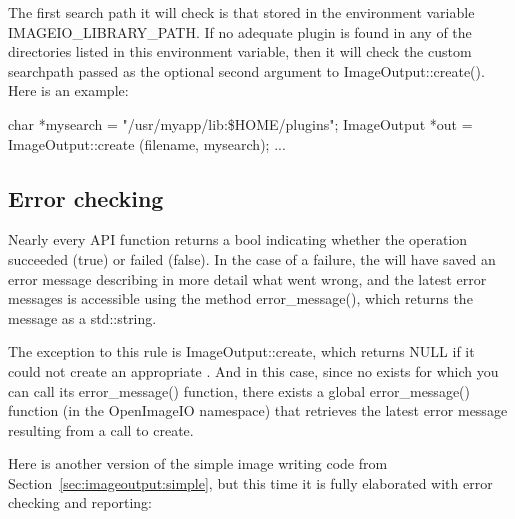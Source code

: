 The first search path it will check is that stored in the environment
variable {\cf IMAGEIO_LIBRARY_PATH}.  If no adequate plugin is found
in any of the directories listed in this environment variable, then
it will check the custom searchpath passed as the optional second
argument to {\cf ImageOutput::create()}.  Here is an example:

\begin{code}
        char *mysearch = "/usr/myapp/lib:\${HOME}/plugins";
        ImageOutput *out = ImageOutput::create (filename, mysearch);
        ...
\end{code}


\subsection{Error checking}
\label{sec:imageoutput:errors}

Nearly every \ImageOutput API function returns a {\cf bool} indicating
whether the operation succeeded ({\cf true}) or failed ({\cf false}).
In the case of a failure, the \ImageOutput will have saved an error
message describing in more detail what went wrong, and the latest
error messages is accessible using the \ImageOutput method 
{\cf error_message()}, which returns the message as a {\cf std::string}.

The exception to this rule is {\cf ImageOutput::create}, which returns
{\cf NULL} if it could not create an appropriate \ImageOutput.  And in
this case, since no \ImageOutput exists for which you can call its {\cf
  error_message()} function, there exists a global {\cf error_message()}
function (in the {\cf OpenImageIO} namespace) that retrieves the latest
error message resulting from a call to {\cf create}.

Here is another version of the simple image writing code from
Section~\ref{sec:imageoutput:simple}, but this time it is fully 
elaborated with error checking and reporting:

